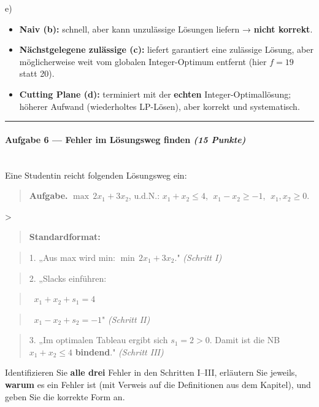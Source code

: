 \documentclass[11pt, a4paper]{article}
\begin{document}
e)

\begin{itemize}
  \item \textbf{Naiv (b):} schnell, aber kann unzulässige Lösungen liefern → \textbf{nicht korrekt}.
  \item \textbf{Nächstgelegene zulässige (c):} liefert garantiert eine zulässige Lösung, aber möglicherweise weit vom globalen Integer-Optimum entfernt (hier $f=19$ statt 20).
  \item \textbf{Cutting Plane (d):} terminiert mit der \textbf{echten} Integer-Optimallösung; höherer Aufwand (wiederholtes LP-Lösen), aber korrekt und systematisch.
\end{itemize}


\noindent\textcolor{rulegray}{\rule{\linewidth}{0.4pt}}


\paragraph{Aufgabe 6 — Fehler im Lösungsweg finden \textit{(15 Punkte)}}\mbox{}\\[2pt]

Eine Studentin reicht folgenden Lösungsweg ein:


\begin{quote}
\textbf{Aufgabe.} $\max\,2x_1 + 3x_2$, u.d.N.: $x_1 + x_2 \leq 4$, $\;x_1 - x_2 \geq -1$, $\;x_1, x_2 \geq 0$.
\end{quote}
>

\begin{quote}
\textbf{Standardformat:}
\end{quote}
\begin{quote}
1. „Aus max wird min: $\min\,2x_1 + 3x_2$." \textit{(Schritt I)}
\end{quote}
\begin{quote}
2. „Slacks einführen:
\end{quote}
\begin{quote}
$\;\;x_1 + x_2 + s_1 = 4$
\end{quote}
\begin{quote}
$\;\;x_1 - x_2 + s_2 = -1$" \textit{(Schritt II)}
\end{quote}
\begin{quote}
3. „Im optimalen Tableau ergibt sich $s_1 = 2 > 0$. Damit ist die NB $x_1 + x_2 \leq 4$ \textbf{bindend}." \textit{(Schritt III)}
\end{quote}

Identifizieren Sie \textbf{alle drei} Fehler in den Schritten I–III, erläutern Sie jeweils, \textbf{warum} es ein Fehler ist (mit Verweis auf die Definitionen aus dem Kapitel), und geben Sie die korrekte Form an.
\end{document}
